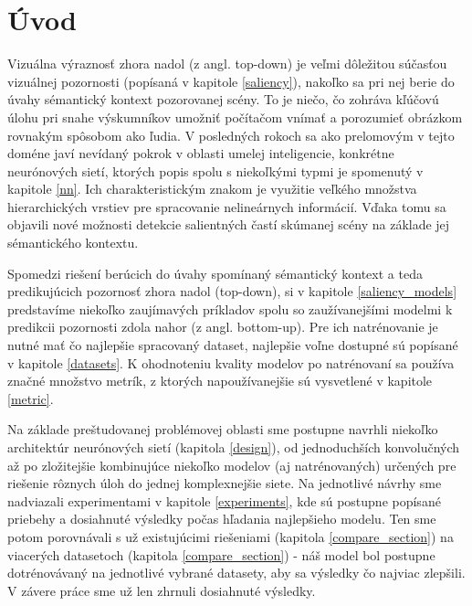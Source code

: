 \newpage
\section{Úvod}
\setcounter{page}{1}

Vizuálna výraznosť zhora nadol (z angl. top-down) je veľmi dôležitou súčasťou vizuálnej pozornosti (popísaná v kapitole \ref{saliency}), nakoľko sa pri nej berie do úvahy sémantický kontext pozorovanej scény. To je niečo, čo zohráva kľúčovú úlohu pri snahe výskumníkov umožniť počítačom vnímať a porozumieť obrázkom rovnakým spôsobom ako ľudia. V posledných rokoch sa ako prelomovým v tejto doméne javí nevídaný pokrok v oblasti umelej inteligencie, konkrétne neurónových sietí, ktorých popis spolu s niekoľkými typmi je spomenutý v kapitole \ref{nn}. Ich charakteristickým znakom je využitie veľkého množstva hierarchických vrstiev pre spracovanie nelineárnych informácií. Vďaka tomu sa objavili nové možnosti detekcie salientných častí skúmanej scény na základe jej sémantického kontextu.

Spomedzi riešení berúcich do úvahy spomínaný sémantický kontext a teda predikujúcich pozornosť zhora nadol (top-down), si v kapitole \ref{saliency_models} predstavíme niekoľko zaujímavých príkladov spolu so zaužívanejšími modelmi k predikcii pozornosti zdola nahor (z angl. bottom-up). Pre ich natrénovanie je nutné mať čo najlepšie spracovaný dataset, najlepšie voľne dostupné sú popísané v kapitole \ref{datasets}. K ohodnoteniu kvality modelov po natrénovaní sa používa značné množstvo metrík, z ktorých napoužívanejšie sú vysvetlené v kapitole \ref{metric}.

Na základe preštudovanej problémovej oblasti sme postupne navrhli niekoľko architektúr neurónových sietí (kapitola \ref{design}), od jednoduchších konvolučných až po zložitejšie kombinujúce niekoľko modelov (aj natrénovaných) určených pre riešenie rôznych úloh do jednej komplexnejšie siete. Na jednotlivé návrhy sme nadviazali experimentami v kapitole \ref{experiments}, kde sú postupne popísané priebehy a dosiahnuté výsledky počas hľadania najlepšieho modelu. Ten sme potom porovnávali s už existujúcimi riešeniami (kapitola \ref{compare_section}) na viacerých datasetoch (kapitola \ref{compare_section}) - náš model bol postupne dotrénovávaný na jednotlivé vybrané datasety, aby sa výsledky čo najviac zlepšili. V závere práce sme už len zhrnuli dosiahnuté výsledky. 

\newpage
\null
\thispagestyle{empty}



